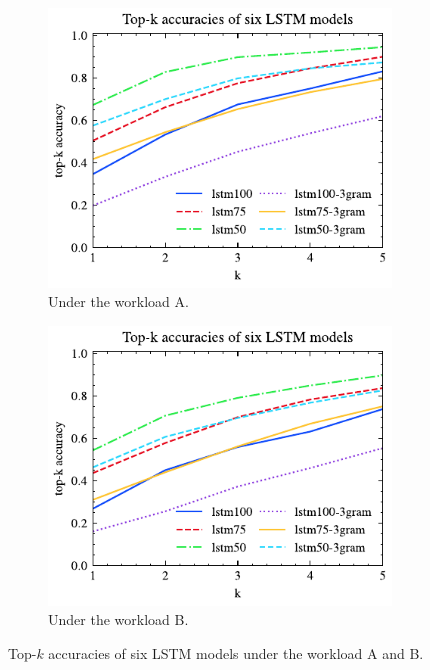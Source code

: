 \documentclass[conference]{IEEEtran}
\begin{document}
\begin{figure}[!th]
	\centering
	\begin{subfigure}{0.45\textwidth}
		\centering
%		
		\includegraphics[]{graphics/top_k_lstm_A.pdf}
		\caption{Under the workload A.}
		\label{fig:top_k_lstm_A}
	\end{subfigure}
	\hfill
	\begin{subfigure}{0.45\textwidth}
		\centering
		\includegraphics[]{graphics/top_k_lstm_B.pdf}
		\caption{Under the workload B.}
		\label{fig:top_k_lstm_B}
	\end{subfigure}
	\caption{Top-$k$ accuracies of six LSTM models under the workload A and B.}
	\label{fig:top_k_lstm_all}
\end{figure}
\end{document}
